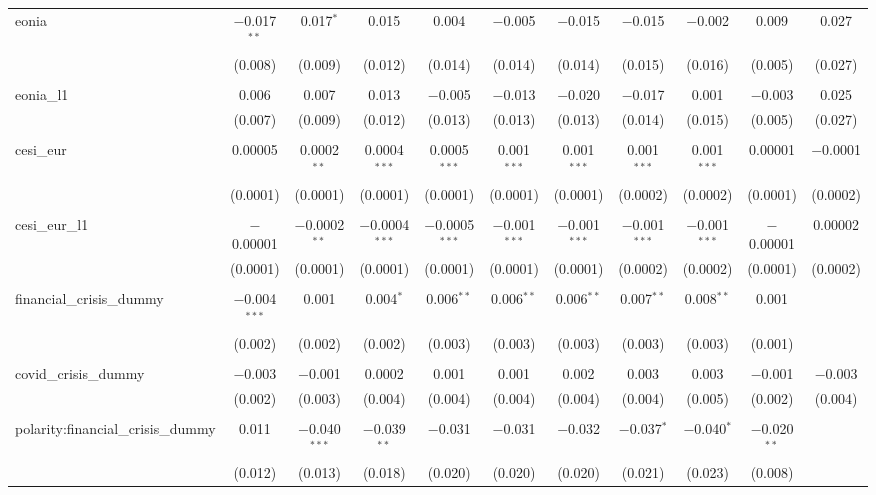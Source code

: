 \begin{table}[!htbp]
\begin{adjustbox}{width=1.25\textwidth}
\begin{tabular}{@{\extracolsep{5pt}}lcccccccccc}
 eonia & $-$0.017$^{**}$ & 0.017$^{*}$ & 0.015 & 0.004 & $-$0.005 & $-$0.015 & $-$0.015 & $-$0.002 & 0.009 & 0.027 \\ 
  & (0.008) & (0.009) & (0.012) & (0.014) & (0.014) & (0.014) & (0.015) & (0.016) & (0.005) & (0.027) \\ 
  & & & & & & & & & & \\ 
 eonia\_l1 & 0.006 & 0.007 & 0.013 & $-$0.005 & $-$0.013 & $-$0.020 & $-$0.017 & 0.001 & $-$0.003 & 0.025 \\ 
  & (0.007) & (0.009) & (0.012) & (0.013) & (0.013) & (0.013) & (0.014) & (0.015) & (0.005) & (0.027) \\ 
  & & & & & & & & & & \\ 
 cesi\_eur & 0.00005 & 0.0002$^{**}$ & 0.0004$^{***}$ & 0.0005$^{***}$ & 0.001$^{***}$ & 0.001$^{***}$ & 0.001$^{***}$ & 0.001$^{***}$ & 0.00001 & $-$0.0001 \\ 
  & (0.0001) & (0.0001) & (0.0001) & (0.0001) & (0.0001) & (0.0001) & (0.0002) & (0.0002) & (0.0001) & (0.0002) \\ 
  & & & & & & & & & & \\ 
 cesi\_eur\_l1 & $-$0.00001 & $-$0.0002$^{**}$ & $-$0.0004$^{***}$ & $-$0.0005$^{***}$ & $-$0.001$^{***}$ & $-$0.001$^{***}$ & $-$0.001$^{***}$ & $-$0.001$^{***}$ & $-$0.00001 & 0.00002 \\ 
  & (0.0001) & (0.0001) & (0.0001) & (0.0001) & (0.0001) & (0.0001) & (0.0002) & (0.0002) & (0.0001) & (0.0002) \\ 
  & & & & & & & & & & \\ 
 financial\_crisis\_dummy & $-$0.004$^{***}$ & 0.001 & 0.004$^{*}$ & 0.006$^{**}$ & 0.006$^{**}$ & 0.006$^{**}$ & 0.007$^{**}$ & 0.008$^{**}$ & 0.001 &  \\ 
  & (0.002) & (0.002) & (0.002) & (0.003) & (0.003) & (0.003) & (0.003) & (0.003) & (0.001) &  \\ 
  & & & & & & & & & & \\ 
 covid\_crisis\_dummy & $-$0.003 & $-$0.001 & 0.0002 & 0.001 & 0.001 & 0.002 & 0.003 & 0.003 & $-$0.001 & $-$0.003 \\ 
  & (0.002) & (0.003) & (0.004) & (0.004) & (0.004) & (0.004) & (0.004) & (0.005) & (0.002) & (0.004) \\ 
  & & & & & & & & & & \\ 
 polarity:financial\_crisis\_dummy & 0.011 & $-$0.040$^{***}$ & $-$0.039$^{**}$ & $-$0.031 & $-$0.031 & $-$0.032 & $-$0.037$^{*}$ & $-$0.040$^{*}$ & $-$0.020$^{**}$ &  \\ 
  & (0.012) & (0.013) & (0.018) & (0.020) & (0.020) & (0.020) & (0.021) & (0.023) & (0.008) &  \\ 

\end{tabular}
\end{adjustbox}
\end{table}
